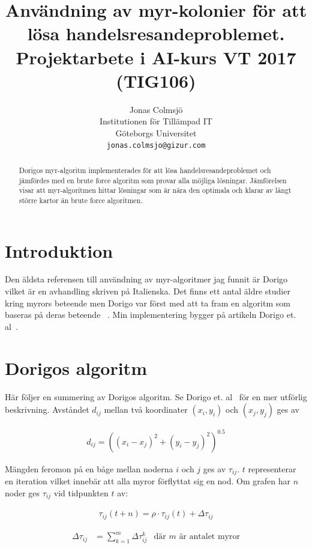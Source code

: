 \documentclass[11pt]{article}
\title{Användning av myr-kolonier för att lösa handelsresandeproblemet. Projektarbete i AI-kurs VT 2017 (TIG106)}
\author{Jonas Colmsjö \\
  Institutionen för Tillämpad IT \\
  Göteborgs Universitet \\
  {\tt jonas.colmsjo@gizur.com}  \\}
\date{}
\begin{document}
\maketitle
\begin{abstract}
  Dorigos myr-algoritm implementerades för att lösa handelsresandeproblemet och  jämfördes med en brute force algoritm som provar alla möjliga lösningar. Jämförelsen visar att myr-algoritmen hittar lösningar som är nära den optimala och klarar av långt större kartor än brute force algoritmen.
\end{abstract}

\section{Introduktion}

Den äldsta referensen till användning av myr-algoritmer jag funnit är
Dorigo~ vilket är en avhandling skriven på Italienska.
Det finns ett antal äldre studier kring myrors beteende men Dorigo var först
med att ta fram en algoritm som baseras på deras beteende ~\cite{aco_wikipedia}. Min implementering bygger på artikeln Dorigo et. al~.

\section{Dorigos algoritm}

Här följer en summering av Dorigos algoritm. Se Dorigo et. al~ för en mer utförlig beskrivning. Avståndet $d_{ij}$ mellan två koordinater $(x_i,y_i)$ och $(x_j, y_j)$ ges av  

\begin{align}
	d_{ij} = ((x_i-x_j)^2 + (y_i-y_j)^2)^{0.5}
\end{align}

Mängden feromon på en båge mellan noderna $i$ och $j$ ges av $\tau_{ij}$. $t$ representerar en iteration vilket innebär att alla myror förflyttat sig en nod. Om grafen har $n$ noder ges $\tau_{ij}$ vid tidpunkten $t$ av:

\begin{align}
	\tau_{ij}(t+n)=\rho \cdot \tau_{ij}(t) + \Delta\tau_{ij}
\end{align}


\begin{align}
	\Delta\tau_{ij} &= \sum_{k=1}^{m} \Delta\tau_{ij}^k & \text{där } m \text{ är antalet myror}
\end{align}
\end{document}
